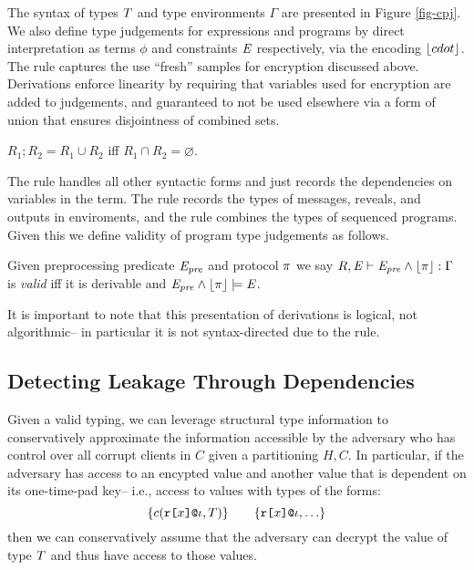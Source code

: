 \cpjfig

The syntax of types $T$ and type environments $\Gamma$ are presented
in Figure \ref{fig-cpj}. We also
define type judgements for expressions and programs by direct
interpretation as terms $\phi$ and constraints $\mathit{E}$ respectively,
via the encoding $\lfloor cdot \rfloor$. The  rule captures
the use ``fresh'' samples for encryption discussed above. Derivations
enforce linearity by requiring that variables used for encryption
are added to judgements, and guaranteed to not be used elsewhere
via a form of union that ensures disjointness of combined sets. 
\begin{definition}
  $R_1;R_2 = R_1 \cup R_2$ iff $R_1 \cap R_2 = \varnothing$.
\end{definition}
The  rule handles all other syntactic forms and just
records the dependencies on variables in the term.  The 
rule records the types of messages, reveals, and outputs in
enviroments, and the  rule combines the types of
sequenced programs.  Given this we define validity of program type
judgements as follows. 
\begin{definition}
  Given preprocessing predicate $\mathit{E}_{\mathit{pre}}$ and protocol $\pi$ we say
  $R,\mathit{E} \vdash \mathit{E}_{\mathit{pre}} \wedge \lfloor \pi \rfloor : \Gamma$ is \emph{valid} iff it is derivable and
  $\mathit{E}_{\mathit{pre}} \wedge \lfloor \pi \rfloor \models \mathit{E}$.
\end{definition}
It is important to note that this presentation of derivations is
logical, not algorithmic-- in particular it is not syntax-directed
due to the  rule.

\subsection{Detecting Leakage Through Dependencies}

Given a valid typing, we can leverage structural type information to
conservatively approximate the information accessible by the
adversary who has control over all corrupt clients in $C$ given
a partitioning $H,C$. In particular, if the adversary has access to an
encypted value and another value that is dependent on its one-time-pad
key-- i.e., access to values with types of the forms:
$$
\{ c(\texttt{r[}x\texttt{]}\texttt{@}\iota,T) \} \qquad \{ \texttt{r[}x\texttt{]}\texttt{@}\iota, \ldots \} 
$$
then we can conservatively assume that the adversary can decrypt the
value of type $T$ and thus have access to those values.

